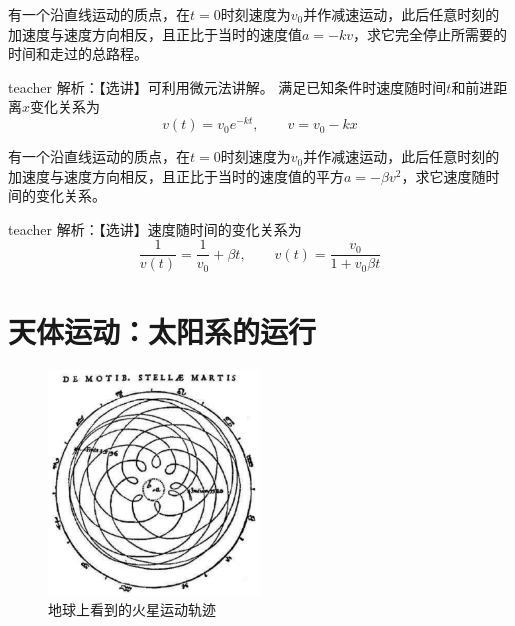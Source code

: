 \begin{example}
有一个沿直线运动的质点，在$t=0$时刻速度为$v_0$并作减速运动，此后任意时刻的加速度与速度方向相反，且正比于当时的速度值$a=-kv$，求它完全停止所需要的时间和走过的总路程。
\begin{taggedblock}{teacher}
\newline
解析：【选讲】可利用微元法讲解。
满足已知条件时速度随时间$t$和前进距离$x$变化关系为
\[
v(t) = v_0e^{-kt},\qquad v = v_0-kx
\]
\end{taggedblock}
\end{example}


\begin{example}
有一个沿直线运动的质点，在$t=0$时刻速度为$v_0$并作减速运动，此后任意时刻的加速度与速度方向相反，且正比于当时的速度值的平方$a=-\beta v^2$，求它速度随时间的变化关系。
\begin{taggedblock}{teacher}
\newline
解析：【选讲】速度随时间的变化关系为
\[
\frac{1}{v(t)} = \frac{1}{v_0}+\beta t,\qquad v(t) = \frac{v_0}{1+ v_0\beta t}
\]
\end{taggedblock}
\end{example}

\section{天体运动：太阳系的运行}
\begin{figure}[h]
\centering
\includegraphics[width=0.5\textwidth]{images/motion-Kepler_Mars_retrograde.pdf}
\caption{地球上看到的火星运动轨迹}
\label{fig:motion-Kepler_Mars_retrograde}
\end{figure}


